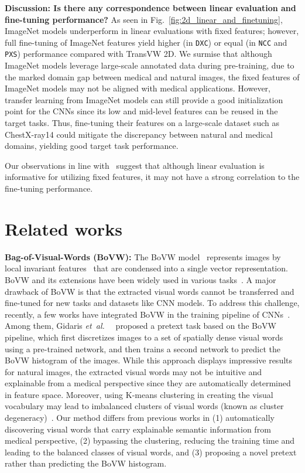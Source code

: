 \documentclass[journal,twoside,web]{ieeecolor}
\def\figurename{Fig.}
\newcommand{\etal}{\mbox{\emph{et al.\ }}}
\begin{document}
\smallskip
\noindent\textbf{Discussion: Is there any correspondence between linear evaluation and fine-tuning performance?}  As seen in \figurename~\ref{fig:2d_linear_and_finetuning},  ImageNet models underperform in linear evaluations with fixed features; however,  full fine-tuning of ImageNet features yield higher (in \texttt{DXC}) or equal  (in \texttt{NCC} and \texttt{PXS}) performance compared with  TransVW 2D. 
We surmise that although ImageNet models leverage large-scale annotated data during pre-training, due to the marked domain gap between medical and natural images, the fixed features of ImageNet models may not be aligned with medical applications. However, transfer learning from ImageNet models can still provide a good initialization point for the CNNs since its low and mid-level features can be reused in the target tasks. Thus, fine-tuning their features on a large-scale dataset such as ChestX-ray14 could mitigate the discrepancy between natural and medical domains, yielding good target task performance.

  Our observations in line with~\cite{Newell2020How} suggest that although linear evaluation is informative for utilizing fixed features, it may not have a strong correlation to the fine-tuning performance. 

\section{Related works}
\label{sec:related_works}

\noindent\textbf{Bag-of-Visual-Words (BoVW):}  
The  BoVW  model~\cite{Sivic2003Video} represents images by local invariant features~\cite{Lowe2004Distinctive} that are condensed into a single vector representation.
BoVW and its extensions  have been widely used in various
tasks~\cite{Ng2015Exploiting}. 
A major drawback of BoVW is that the extracted visual words cannot be transferred and fine-tuned for new tasks and datasets like CNN models.
To address this challenge, recently, a few works have integrated BoVW in the training pipeline of  CNNs~\cite{Gidaris2020Learning,Arandjelovic2016NetVLAD}. Among them,  Gidaris \etal~\cite{Gidaris2020Learning}  proposed a  pretext task based on the BoVW pipeline, which first discretizes images to a set of spatially dense visual words using a pre-trained network, and then  trains  a  second  network  to  predict  the BoVW histogram of the images. While this approach displays impressive results for natural images, the extracted visual words may not be intuitive and explainable from a medical perspective since they are automatically determined in feature space. Moreover, using K-means clustering in creating the visual vocabulary may lead to imbalanced clusters of visual words (known as cluster degeneracy)~\cite{gansbeke2020scan}. Our method differs from previous works in  (1)  automatically discovering visual words that carry explainable semantic information from medical perspective,
(2) bypassing the clustering, reducing the training time and leading to the balanced classes of visual words, and (3) proposing a novel pretext rather than predicting the BoVW histogram.  
\end{document}
